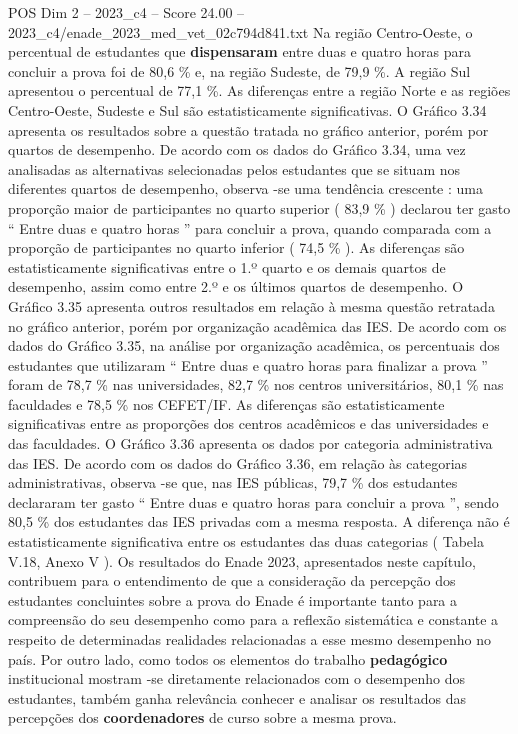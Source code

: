 \begin{textsample}{POS Dim 2 – 2023\_c4 – Score 24.00 – 2023\_c4/enade\_2023\_med\_vet\_02c794d841.txt}
Na região Centro-Oeste, o percentual de estudantes que \textbf{dispensaram} entre duas e quatro horas para concluir a prova foi de 80,6 \% e, na região Sudeste, de 79,9 \%.
A região Sul apresentou o percentual de 77,1 \%.
As diferenças entre a região Norte e as regiões Centro-Oeste, Sudeste e Sul são estatisticamente significativas.
O Gráfico 3.34 apresenta os resultados sobre a questão tratada no gráfico anterior, porém por quartos de desempenho.
De acordo com os dados do Gráfico 3.34, uma vez analisadas as alternativas selecionadas pelos estudantes que se situam nos diferentes quartos de desempenho, observa -se uma tendência crescente : uma proporção maior de participantes no quarto superior ( 83,9 \% ) declarou ter gasto “ Entre duas e quatro horas ” para concluir a prova, quando comparada com a proporção de participantes no quarto inferior ( 74,5 \% ).
As diferenças são estatisticamente significativas entre o 1.º quarto e os demais quartos de desempenho, assim como entre 2.º e os últimos quartos de desempenho.
O Gráfico 3.35 apresenta outros resultados em relação à mesma questão retratada no gráfico anterior, porém por organização acadêmica das IES.
De acordo com os dados do Gráfico 3.35, na análise por organização acadêmica, os percentuais dos estudantes que utilizaram “ Entre duas e quatro horas para finalizar a prova ” foram de 78,7 \% nas universidades, 82,7 \% nos centros universitários, 80,1 \% nas faculdades e 78,5 \% nos CEFET/IF.
As diferenças são estatisticamente significativas entre as proporções dos centros acadêmicos e das universidades e das faculdades.
O Gráfico 3.36 apresenta os dados por categoria administrativa das IES.
De acordo com os dados do Gráfico 3.36, em relação às categorias administrativas, observa -se que, nas IES públicas, 79,7 \% dos estudantes declararam ter gasto “ Entre duas e quatro horas para concluir a prova ”, sendo 80,5 \% dos estudantes das IES privadas com a mesma resposta.
A diferença não é estatisticamente significativa entre os estudantes das duas categorias ( Tabela V.18, Anexo V ).
Os resultados do Enade 2023, apresentados neste capítulo, contribuem para o entendimento de que a consideração da percepção dos estudantes concluintes sobre a prova do Enade é importante tanto para a compreensão do seu desempenho como para a reflexão sistemática e constante a respeito de determinadas realidades relacionadas a esse mesmo desempenho no país.
Por outro lado, como todos os elementos do trabalho \textbf{pedagógico} institucional mostram -se diretamente relacionados com o desempenho dos estudantes, também ganha relevância conhecer e analisar os resultados das percepções dos \textbf{coordenadores} de curso sobre a mesma prova.

\end{textsample}
